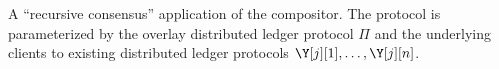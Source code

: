 \begin{algorithm}
  \caption{\label{alg.consensus} A ``recursive consensus'' application of the \rollerblade compositor.
  The protocol is parameterized by the overlay distributed ledger protocol $\Pi$ and the underlying
  clients to existing distributed ledger protocols $\Y[j][1], \ldots, \Y[j][n]$.}
  \begin{algorithmic}[1]
    \Protocol{$\recursiveConsensus_{\Pi}$}
      \Function{\construct}{$\Y[j]$}
      \EndFunction

      \Function{\lread}{\,}
        \EndFor
      \EndFunction

      \Function{\lwrite}{$\tx$}
        \EndFor
      \EndFunction
    \EndProtocol
    \vskip2pt
  \end{algorithmic}
\end{algorithm}
